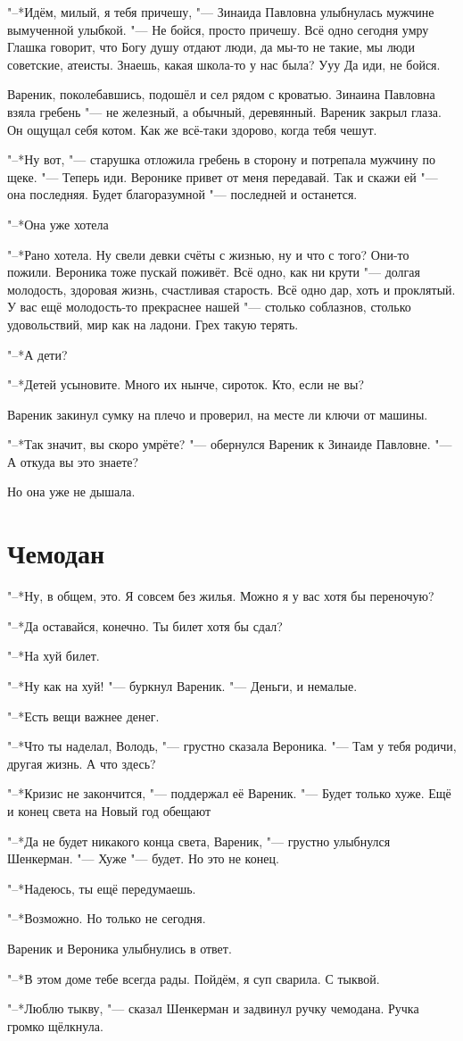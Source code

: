 "--*Идём, милый, я тебя причешу, "--- Зинаида Павловна улыбнулась мужчине вымученной улыбкой.
"--- Не бойся, просто причешу.
Всё одно сегодня умру\ldotst
Глашка говорит, что Богу душу отдают люди, да мы-то не такие, мы люди советские, атеисты.
Знаешь, какая школа-то у нас была?
Ууу\ldotst
Да иди, не бойся.

Вареник, поколебавшись, подошёл и сел рядом с кроватью.
Зинаина Павловна взяла гребень "--- не железный, а обычный, деревянный.
Вареник закрыл глаза.
Он ощущал себя котом.
Как же всё-таки здорово, когда тебя чешут.

"--*Ну вот, "--- старушка отложила гребень в сторону и потрепала мужчину по щеке.
"--- Теперь иди.
Веронике привет от меня передавай.
Так и скажи ей "--- она последняя.
Будет благоразумной "--- последней и останется.

"--*Она уже хотела\ldotst

"--*Рано хотела.
Ну свели девки счёты с жизнью, ну и что с того?
Они-то пожили.
Вероника тоже пускай поживёт.
Всё одно, как ни крути "--- долгая молодость, здоровая жизнь, счастливая старость.
Всё одно дар, хоть и проклятый.
У вас ещё молодость-то прекраснее нашей "--- столько соблазнов, столько удовольствий, мир как на ладони.
Грех такую терять.

"--*А дети?

"--*Детей усыновите.
Много их нынче, сироток.
Кто, если не вы?

Вареник закинул сумку на плечо и проверил, на месте ли ключи от машины.

"--*Так значит, вы скоро умрёте? "--- обернулся Вареник к Зинаиде Павловне. 
"--- А откуда вы это знаете?

Но она уже не дышала.

\section{Чемодан}

"--*Ну, в общем, это.
Я совсем без жилья.
Можно я у вас хотя бы переночую?

"--*Да оставайся, конечно.
Ты билет хотя бы сдал?

"--*На хуй билет.

"--*Ну как на хуй! "--- буркнул Вареник.
"--- Деньги, и немалые.

"--*Есть вещи важнее денег.

"--*Что ты наделал, Володь, "--- грустно сказала Вероника.
"--- Там у тебя родичи, другая жизнь.
А что здесь?

"--*Кризис не закончится, "--- поддержал её Вареник.
"--- Будет только хуже.
Ещё и конец света на Новый год обещают\ldotst

"--*Да не будет никакого конца света, Вареник, "--- грустно улыбнулся Шенкерман.
"--- Хуже "--- будет.
Но это не конец.

"--*Надеюсь, ты ещё передумаешь.

"--*Возможно.
Но только не сегодня.

Вареник и Вероника улыбнулись в ответ.

"--*В этом доме тебе всегда рады.
Пойдём, я суп сварила.
С тыквой.

"--*Люблю тыкву, "--- сказал Шенкерман и задвинул ручку чемодана.
Ручка громко щёлкнула.
